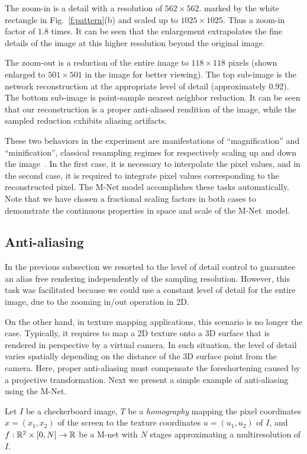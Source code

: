 The zoom-in is a detail with a resolution of $562\times 562$. marked by the white rectangle in Fig.~\ref{f:pattern}(b) and scaled up to $1025\times 1025$. Thus a zoom-in factor of $1.8$ times. It can be seen that the enlargement extrapolates the fine details of the image at this higher resolution beyond the original image. 

The zoom-out is a reduction of the entire image to $118\times 118$ pixels (shown enlarged to $501\times 501$ in the image for better viewing). The top sub-image is the network reconstruction at the appropriate level of detail (approximately 0.92). The bottom sub-image is point-sample nearest neighbor reduction. It can be seen that our reconstruction is a proper anti-aliased rendition of the image, while the sampled reduction exhibits aliasing artifacts.

These two behaviors in the experiment are manifestations of ``magnification'' and ``minification'', classical resampling regimes for respectively scaling up and down the image~\cite{pixel}. In the first case, it is necessary to interpolate the pixel values, and in the second case, it is required to integrate pixel values corresponding to the reconstructed pixel. The M-Net model accomplishes these tasks automatically.
Note that we have chosen a fractional scaling factors in both cases to demonstrate the continuous properties in space and scale of the M-Net~model.


\subsection{Anti-aliasing}

In the previous subsection we resorted to the level of detail control to guarantee an alias free rendering independently of the sampling resolution. However, this task was facilitated because we could use a constant level of detail for the entire image, due to the zooming in/out operation in 2D.

On the other hand, in texture mapping applications, this scenario is no longer the case. Typically, it requires to map a 2D texture onto a 3D surface that is rendered in perspective by a virtual camera. In such situation, the level of detail varies spatially depending on the distance of the 3D surface point from the camera. Here, proper anti-aliasing must compensate the foreshortening caused by a projective transformation. Next we present a simple example of anti-aliasing using the M-Net.

Let $I$ be a checkerboard image, $T$ be a \textit{homography} mapping the pixel coordinates $x=(x_1,x_2)$ of the screen to the texture coordinates $u=(u_1,u_2)$ of $I$, and $f:\mathbb{R}^2\times [0,N]\to \mathbb{R}$ be a M-net with $N$ stages approximating a multiresolution of $I$. 


